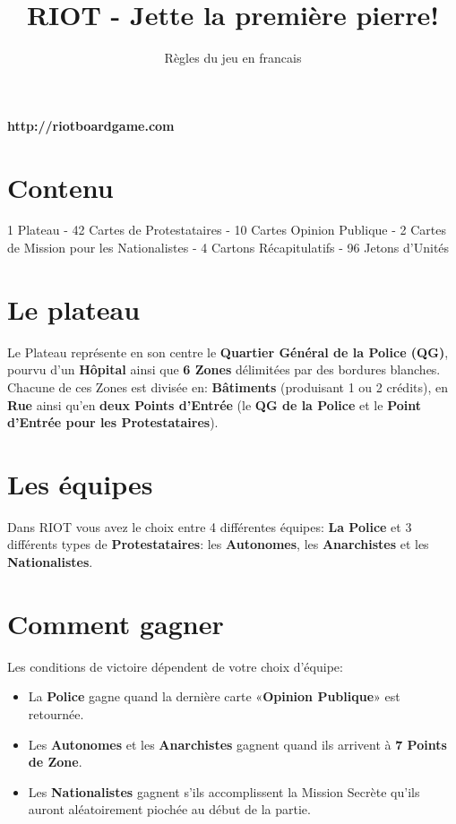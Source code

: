 \documentclass[a4paper,13pt]{scrartcl}
\title{RIOT - Jette la première pierre!}
\subtitle{Règles du jeu en francais}
\author{}
\date{}
\begin{document}
\maketitle

\textbf{http://riotboardgame.com} 


\section*{Contenu}
1 Plateau - 42 Cartes de Protestataires - 10 Cartes Opinion Publique - 2 Cartes de Mission pour les Nationalistes - 4 Cartons Récapitulatifs - 96 Jetons d'Unités

\section*{Le plateau}
Le Plateau représente en son centre le \textbf{Quartier Général de la Police (QG)}, pourvu d'un \textbf{Hôpital} ainsi que \textbf{6 Zones} délimitées par des bordures blanches. Chacune de ces Zones est divisée en: \textbf{Bâtiments} (produisant 1 ou 2 crédits), en \textbf{Rue} ainsi qu'en \textbf{deux Points d'Entrée} (le\textbf{ QG de la Police} et le \textbf{Point d'Entrée pour les Protestataires}).


\section*{Les équipes}
Dans RIOT vous avez le choix entre 4 différentes équipes: \textbf{La Police} et 3 différents types de \textbf{Protestataires}: les \textbf{Autonomes}, les \textbf{Anarchistes} et les \textbf{Nationalistes}.

\section*{Comment gagner}
Les conditions de victoire dépendent de votre choix d'équipe:
\begin{itemize}
\item La \textbf{Police} gagne quand la dernière carte «\textbf{Opinion Publique}» est retournée.
\item Les \textbf{Autonomes} et les \textbf{Anarchistes} gagnent quand ils arrivent à \textbf{7 Points de Zone}.
\item Les \textbf{Nationalistes} gagnent s'ils accomplissent la Mission Secrète qu'ils auront aléatoirement piochée au début de la partie.
\end{itemize}
\end{document}
